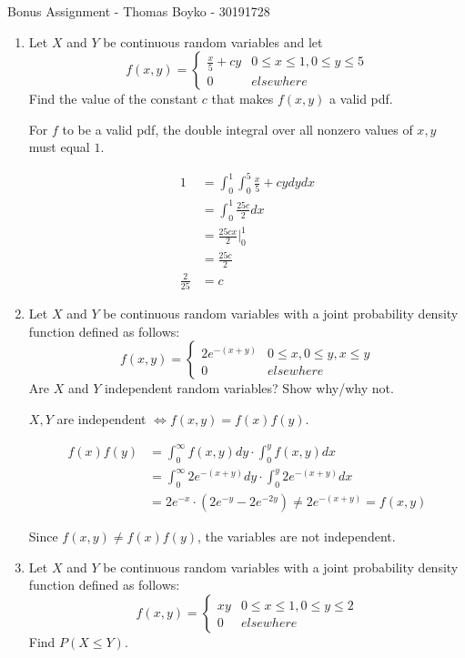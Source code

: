 \documentclass{article}
\begin{document}
\huge Bonus Assignment - Thomas Boyko - 30191728
\normalsize
\begin{enumerate} 

\item Let $X$ and $Y$ be continuous random variables and let
\[f(x,y)=\begin{cases} 
\frac{x}{5}+cy&0\leq x\leq 1, 0\leq y \leq5\\
0 & elsewhere
 \end{cases}\]
Find the value of the constant $c$ that makes $f(x, y)$ a valid pdf.

For $f$ to be a valid pdf, the double integral over all nonzero values of $x,y$ must equal $1$.

\begin{align*} 
1&=\int_{0}^{1}\int_{0}^{5}\frac{x}{5}+cy dydx\\
&=\int_{0}^{1}\frac{25c}{2}dx\\
&=\frac{25cx}{2}|^{1}_{0}\\
&=\frac{25c}{2}\\
\frac{2}{25}&=c
\end{align*}

\item Let $X$ and $Y$ be continuous random variables with a joint probability density function
defined as follows:
\[f(x, y) =\begin{cases} 
2e^{-(x+y)} & 0\leq x, 0\leq y, x\leq y\\
0 & elsewhere
\end{cases}\]
Are $X$ and $Y$ independent random variables? Show why/why not.

$X,Y$ are independent $\iff f(x,y)=f(x)f(y)$.

\begin{align*} 
f(x)f(y)&=\int_{0}^{\infty}f(x,y)dy \cdot\int_{0}^{y}f(x,y)dx\\
&=\int_{0}^{\infty}2e^{-(x+y)}dy \cdot\int_{0}^{y}2e^{-(x+y)}dx\\
&=2e^{-x}\cdot(2e^{-y} -2e^{-2y})\neq2e^{-(x+y)}=f(x,y)
\end{align*}

Since $f(x,y)\neq f(x)f(y)$, the variables are not independent.

\item Let $X$ and $Y$ be continuous random variables with a joint probability density function
defined as follows:
\[f(x, y) = \begin{cases} 
xy &0 \leq x \leq 1, 0 \leq y \leq 2\\
0 & elsewhere
\end{cases}\]
Find $P(X \leq Y).$


\end{enumerate}
\end{document}
